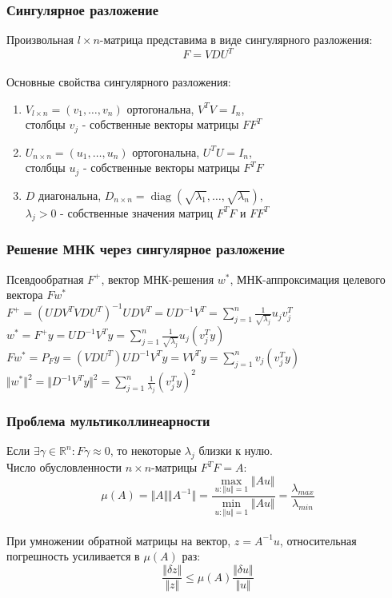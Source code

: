 \documentclass[10pt]{beamer}
\begin{document}
\begin{frame}\frametitle{Сингулярное разложение}
Произвольная $l \times n$-матрица представима в виде сингулярного разложения:\\
$$F = VDU^T$$\\
Основные свойства сингулярного разложения:\\
\begin{enumerate}[--]
\item $V_{l \times n} = (v_1, \dots, v_n)$ ортогональна, $V^TV = I_n$, \\столбцы $v_j$ - собственные векторы матрицы $FF^T$
\item $U_{n \times n} = (u_1, \dots, u_n)$ ортогональна, $U^TU = I_n$, \\столбцы $u_j$ - собственные векторы матрицы $F^TF$
\item $D$ диагональна, $D_{n \times n} = \operatorname{diag} (\sqrt{\lambda_1}, \dots, \sqrt{\lambda_n})$, \\$\lambda_j > 0$ - собственные значения матриц $F^TF$ и $FF^T$
\end{enumerate}
\end{frame}

\begin{frame}\frametitle{Решение МНК через сингулярное разложение}
Псевдообратная $F^+$, вектор МНК-решения $w^*$,
МНК-аппроксимация целевого вектора $Fw^*$\\
$F^+ = (UDV^TVDU^T)^{-1}UDV^T = UD^{-1}V^T = \sum\limits_{j=1}^n \frac{1}{\sqrt{\lambda_j}}  u_j v_j^T$\\
$ w^* = F^+y = UD^{-1}V^Ty = \sum\limits_{j=1}^n \frac{1}{\sqrt{\lambda_j}}  u_j (v_j^Ty)$\\
$F w^* = P_F y = (VDU^T)UD^{-1}V^Ty = VV^Ty = \sum\limits_{j=1}^n v_j (v_j^Ty)$\\
$\Vert w^* \Vert^2  = \Vert D^{-1}V^Ty \Vert^2 = \sum\limits_{j=1}^n \frac{1}{\lambda_j} (v_j^Ty)^2$
\end{frame}

\begin{frame}\frametitle{Проблема мультиколлинеарности}
Если $\exists \gamma \in \mathbb{R}^n: F\gamma \approx 0$, то некоторые $\lambda_j$ близки к нулю.\\
Число обусловленности $n \times n$-матрицы $F^TF = A$:
$$\mu(A) = \Vert A \Vert \Vert A^{-1} \Vert = \frac{\max\limits_{u: \Vert u \Vert = 1} \Vert A u \Vert}{\min\limits_{u: \Vert u \Vert = 1} \Vert A u \Vert} = \frac{\lambda_{max}}{\lambda_{min}}$$\\
При умножении обратной матрицы на вектор, $z = A^{-1}u$, относительная погрешность усиливается в $\mu(A)$ раз:\\
$$\frac{\Vert \delta z \Vert}{\Vert z \Vert } \leq \mu(A) \frac{\Vert \delta u \Vert}{\Vert u \Vert }$$
\end{frame}
\end{document}

